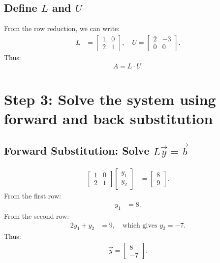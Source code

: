 \documentclass[journal]{IEEEtran}
\begin{document}
\subsection*{Define \(L\) and \(U\)}
From the row reduction, we can write:
\begin{align}
    L &= \begin{bmatrix} 1 & 0 \\ 2 & 1 \end{bmatrix}, \quad
    U = \begin{bmatrix} 2 & -3 \\ 0 & 0 \end{bmatrix}.
\end{align}
Thus:
\begin{align}
    A = L \cdot U.
\end{align}

\section*{Step 3: Solve the system using forward and back substitution}

\subsection*{Forward Substitution: Solve \(L \vec{y} = \vec{b}\)}
\begin{align}
    \begin{bmatrix} 1 & 0 \\ 2 & 1 \end{bmatrix}
    \begin{bmatrix} y_1 \\ y_2 \end{bmatrix} &=
    \begin{bmatrix} 8 \\ 9 \end{bmatrix}.
\end{align}
From the first row:
\begin{align}
    y_1 &= 8.
\end{align}
From the second row:
\begin{align}
    2y_1 + y_2 &= 9, \quad \text{which gives } y_2 = -7.
\end{align}
Thus:
\begin{align}
    \vec{y} = \begin{bmatrix} 8 \\ -7 \end{bmatrix}.
\end{align}
\end{document}
